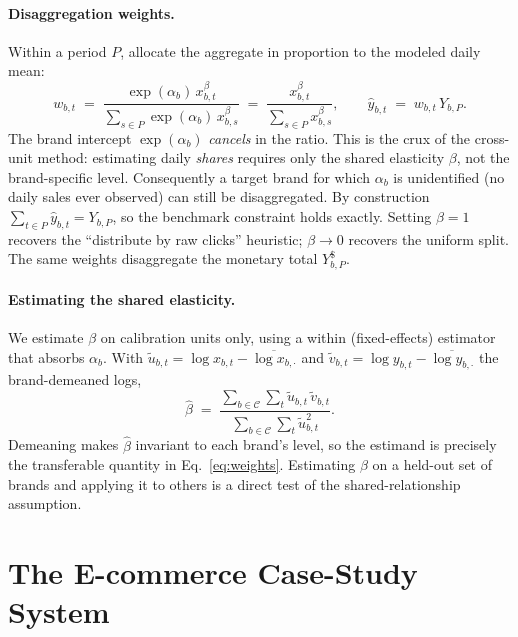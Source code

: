 \documentclass[11pt]{article}
\begin{document}
\paragraph{Disaggregation weights.}
Within a period $P$, allocate the aggregate in proportion to the modeled daily
mean:
\begin{equation}
w_{b,t} \;=\; \frac{\exp(\alpha_b)\,x_{b,t}^{\beta}}
{\sum_{s\in P}\exp(\alpha_b)\,x_{b,s}^{\beta}}
\;=\; \frac{x_{b,t}^{\beta}}{\sum_{s\in P} x_{b,s}^{\beta}},
\qquad
\hat{y}_{b,t} \;=\; w_{b,t}\,Y_{b,P}.
\label{eq:weights}
\end{equation}
The brand intercept $\exp(\alpha_b)$ \emph{cancels} in the ratio. This is the
crux of the cross-unit method: estimating daily \emph{shares} requires only the
shared elasticity $\beta$, not the brand-specific level. Consequently a target
brand for which $\alpha_b$ is unidentified (no daily sales ever observed) can
still be disaggregated. By construction $\sum_{t\in P}\hat{y}_{b,t}=Y_{b,P}$, so
the benchmark constraint holds exactly. Setting $\beta=1$ recovers the
``distribute by raw clicks'' heuristic; $\beta\!\to\!0$ recovers the uniform
split. The same weights disaggregate the monetary total $Y^{\$}_{b,P}$.

\paragraph{Estimating the shared elasticity.}
We estimate $\beta$ on calibration units only, using a within (fixed-effects)
estimator that absorbs $\alpha_b$. With $\tilde{u}_{b,t}=\log x_{b,t} -
\overline{\log x_{b,\cdot}}$ and $\tilde{v}_{b,t}=\log y_{b,t} -
\overline{\log y_{b,\cdot}}$ the brand-demeaned logs,
\begin{equation}
\hat{\beta} \;=\;
\frac{\sum_{b\in\mathcal{C}}\sum_{t}\tilde{u}_{b,t}\,\tilde{v}_{b,t}}
{\sum_{b\in\mathcal{C}}\sum_{t}\tilde{u}_{b,t}^{2}}.
\label{eq:beta}
\end{equation}
Demeaning makes $\hat{\beta}$ invariant to each brand's level, so the estimand
is precisely the transferable quantity in Eq.~\eqref{eq:weights}. Estimating
$\beta$ on a held-out set of brands and applying it to others is a direct test
of the shared-relationship assumption.

\section{The E-commerce Case-Study System}\label{sec:system}
\end{document}
